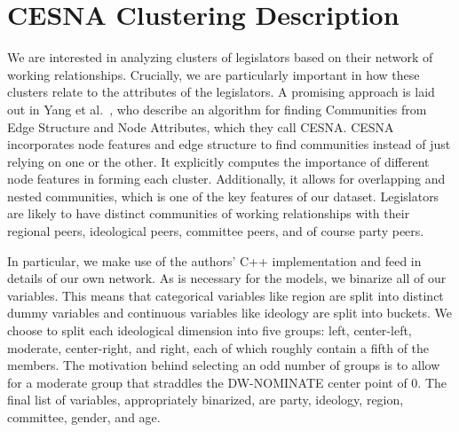 \section{CESNA Clustering Description}

We are interested in analyzing clusters of legislators based on their network of working relationships. Crucially, we are particularly important in how these clusters relate to the attributes of the legislators. A promising approach is laid out in Yang et al.~\cite{Yang}, who describe an algorithm for finding Communities from Edge Structure and Node Attributes, which they call CESNA. CESNA incorporates node features and edge structure to find communities instead of just relying on one or the other. It explicitly computes the importance of different node features in forming each cluster. Additionally, it allows for overlapping and nested communities, which is one of the key features of our dataset. Legislators are likely to have distinct communities of working relationships with their regional peers, ideological peers, committee peers, and of course party peers. 

In particular, we make use of the authors' C++ implementation and feed in details of our own network. As is necessary for the models, we binarize all of our variables. This means that categorical variables like region are split into distinct dummy variables and continuous variables like ideology are split into buckets. We choose to split each ideological dimension into five groups: left, center-left, moderate, center-right, and right, each of which roughly contain a fifth of the members. The motivation behind selecting an odd number of groups is to allow for a moderate group that straddles the DW-NOMINATE center point of 0. The final list of variables, appropriately binarized, are party, ideology, region, committee, gender, and age.